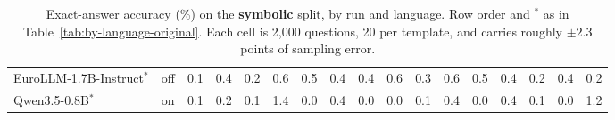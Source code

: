 \begin{table}
{\begin{tabular}{llrrrrrrrrrrrrrrr}
EuroLLM-1.7B-Instruct$^{*}$ & off & 0.1 & 0.4 & 0.2 & 0.6 & 0.5 & 0.4 & 0.4 & 0.6 & 0.3 & 0.6 & 0.5 & 0.4 & 0.2 & 0.4 & 0.2 \\
Qwen3.5-0.8B$^{*}$ & on & 0.1 & 0.2 & 0.1 & 1.4 & 0.0 & 0.4 & 0.0 & 0.0 & 0.1 & 0.4 & 0.0 & 0.4 & 0.1 & 0.0 & 1.2 \\
\bottomrule
\end{tabular}}
\caption{Exact-answer accuracy (\%) on the \textbf{symbolic} split, by run and language. Row order and $^{*}$ as in Table~\ref{tab:by-language-original}. Each cell is 2{,}000 questions, 20 per template, and carries roughly $\pm 2.3$ points of sampling error.}
\label{tab:by-language-symbolic}
\end{table}

